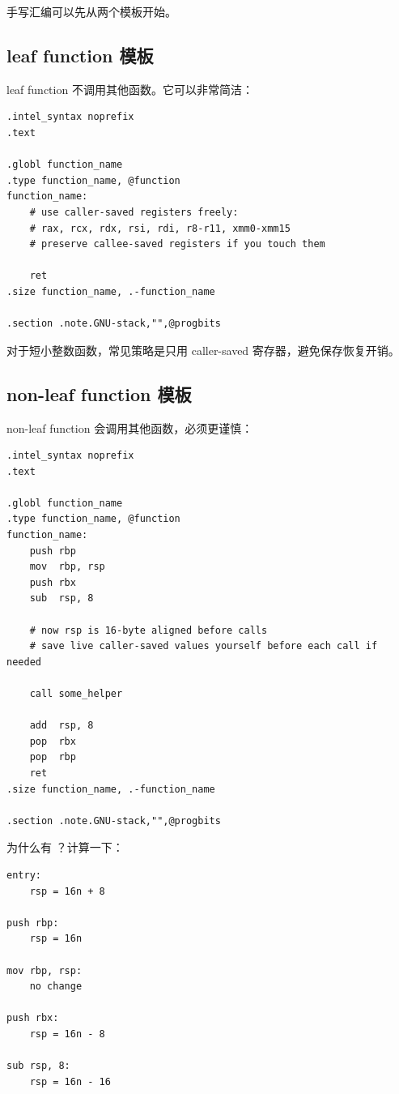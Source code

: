 手写汇编可以先从两个模板开始。

\subsection{leaf function 模板}

leaf function 不调用其他函数。它可以非常简洁：

\begin{lstlisting}
.intel_syntax noprefix
.text

.globl function_name
.type function_name, @function
function_name:
    # use caller-saved registers freely:
    # rax, rcx, rdx, rsi, rdi, r8-r11, xmm0-xmm15
    # preserve callee-saved registers if you touch them

    ret
.size function_name, .-function_name

.section .note.GNU-stack,"",@progbits
\end{lstlisting}

对于短小整数函数，常见策略是只用 caller-saved 寄存器，避免保存恢复开销。

\subsection{non-leaf function 模板}

non-leaf function 会调用其他函数，必须更谨慎：

\begin{lstlisting}
.intel_syntax noprefix
.text

.globl function_name
.type function_name, @function
function_name:
    push rbp
    mov  rbp, rsp
    push rbx
    sub  rsp, 8

    # now rsp is 16-byte aligned before calls
    # save live caller-saved values yourself before each call if needed

    call some_helper

    add  rsp, 8
    pop  rbx
    pop  rbp
    ret
.size function_name, .-function_name

.section .note.GNU-stack,"",@progbits
\end{lstlisting}

为什么有 ？计算一下：

\begin{lstlisting}
entry:
    rsp = 16n + 8

push rbp:
    rsp = 16n

mov rbp, rsp:
    no change

push rbx:
    rsp = 16n - 8

sub rsp, 8:
    rsp = 16n - 16
\end{lstlisting}

